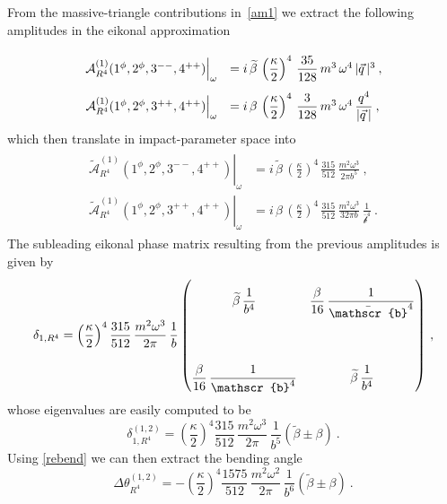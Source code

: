 \documentclass[a4paper,11pt]{article}
\numberwithin{equation}{section}
\newcommand{\cA}{\mathcal{A}}
\def\cA{\mathcal{A}}
\begin{document}
From the massive-triangle contributions in~\eqref{am1} we extract the following amplitudes in the eikonal approximation
\begin{equation}
\def\arraystretch{2.5}
\begin{array}{rl}
\left. \cA^{(1)}_{R^4} (1^\phi,2^\phi,3^{--},4^{++})\right|_{\omega} & = i \, \widetilde{\beta} \, \left(\dfrac{\kappa}{2}\right)^4 \, \dfrac{35}{128} \, m^3 \, \omega^4 \, |\vec{q}\, |^3  \> ,\\
\left. \cA^{(1)}_{R^4} (1^\phi,2^\phi,3^{++},4^{++})\right|_{\omega} & = i \, \beta \, \left(\dfrac{\kappa}{2}\right)^4 \, \dfrac{3}{128} \, m^3 \, \omega^4 \, \dfrac{q^4}{|\vec{q}\,|}  \> ,
\end{array}
\end{equation}
which then translate in impact-parameter space into
\begin{align}
\begin{split}
\left. \widetilde{\cA}^{(1)}_{ R^4} (1^\phi,2^\phi,3^{--},4^{++})\right|_{\omega} & = i \, \widetilde{\beta} \, \left(\frac{\kappa}{2}\right)^4 \, \frac{315}{512} \, \frac{m^2 \omega ^3}{2\pi b^5}\> , \\
\left. \widetilde{\cA}^{(1)}_{ R^4} (1^\phi,2^\phi,3^{++},4^{++})\right|_{\omega} & = i \, \beta \, \left(\frac{\kappa}{2}\right)^4 \, \frac{315}{512}  \,  \frac{m^2 \omega ^3}{32 \pi b} \, \frac{1}{\bar{\mathscr{b}}^4} \> .
\end{split}
\end{align}
The subleading eikonal phase matrix resulting from the previous amplitudes is given by
\begin{equation}
\delta_{1,R^4}= \left(\frac{\kappa}{2}\right)^4 \frac{315}{512}\, \frac{m^2 \omega^3}{2\pi}\, \frac{1}{b}\, \mqty( \widetilde{\beta} \, \dfrac{1}{b^4} & \dfrac{\beta}{16} \, \dfrac{1}{\bar{\mathscr{b}}^4} \\ \cr
\dfrac{\beta}{16} \, \dfrac{1}{\mathscr{b}^4} & \widetilde{\beta} \, \dfrac{1}{b^4})\ ,
\end{equation}
whose eigenvalues are easily computed to be
\begin{equation}
    \delta_{1,R^4}^{(1,2)} = \left(\frac{\kappa}{2}\right)^4 \frac{315}{512}\, \frac{m^2 \omega^3}{2\pi}\, \frac{1}{b^5} \left(\widetilde{\beta} \pm \beta\right)\ .
\end{equation}
Using \eqref{rebend} we can then extract the bending angle
\begin{equation}
    \Delta\theta_{R^4}^{(1,2)} = - \left(\frac{\kappa}{2}\right)^4 \frac{1575}{512}\, \frac{m^2 \omega^2}{2\pi}\, \frac{1}{b^6} \left(\widetilde{\beta} \pm \beta\right)\ .
\end{equation}
\end{document}
